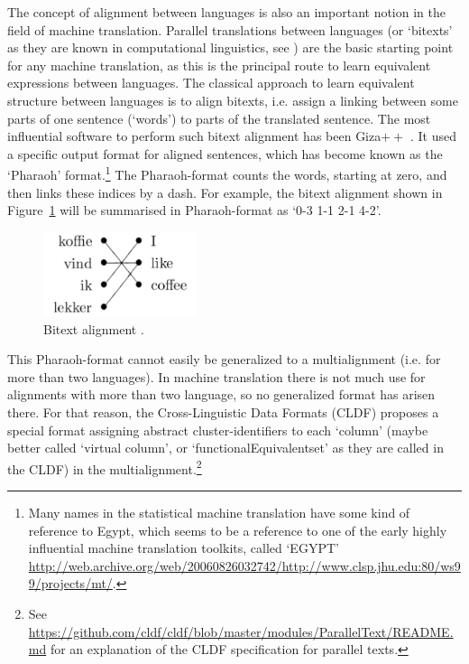 \documentclass[11pt]{article}
\begin{document}
The concept of alignment between languages is also an important notion in the field of machine translation. Parallel translations between languages (or `bitexts' as they are known in computational linguistics, see \cite{tiedemann2011}) are the basic starting point for any machine translation, as this is the principal route to learn equivalent expressions between languages. The classical approach to learn equivalent structure between languages is to align bitexts, i.e. assign a linking between some parts of one sentence (`words') to parts of the translated sentence. The most influential software to perform such bitext alignment has been Giza$++$ \parencite{och2003}. It used a specific output format for aligned sentences, which has become known as the `Pharaoh' format.\footnote{Many names in the statistical machine translation have some kind of reference to Egypt, which seems to be a reference to one of the early highly influential machine translation toolkits, called `EGYPT' \url{http://web.archive.org/web/20060826032742/http://www.clsp.jhu.edu:80/ws99/projects/mt/}.} The Pharaoh-format counts the words, starting at zero, and then links these indices by a dash. For example, the bitext alignment shown in Figure~\ref{fig:bitext_tiedemann} will be summarised in Pharaoh-format as `0-3 1-1 2-1 4-2'.

\begin{figure}[htbp]
  \centering
  \includegraphics[width=0.4\textwidth]{images/bitext_tiedemann.png}
  \caption{Bitext alignment \parencite[4]{tiedemann2011}.}
  \label{fig:bitext_tiedemann}
\end{figure}

This Pharaoh-format cannot easily be generalized to a multialignment (i.e. for more than two languages). In machine translation there is not much use for alignments with more than two language, so no generalized format has arisen there. For that reason, the Cross-Linguistic Data Formats (CLDF) proposes a special format assigning  abstract cluster-identifiers to each `column' (maybe better called `virtual column', or `functionalEquivalentset' as they are called in the CLDF) in the multialignment.\footnote{See \url{https://github.com/cldf/cldf/blob/master/modules/ParallelText/README.md} for an explanation of the CLDF specification for parallel texts.}
\end{document}
